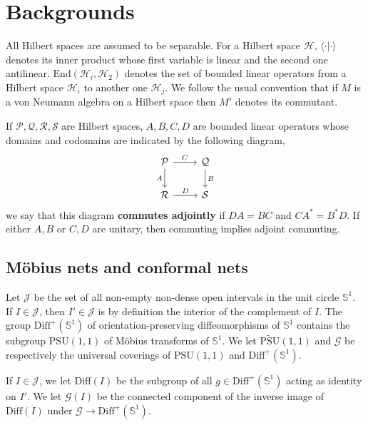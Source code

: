 \documentclass[12pt,a4paper,notitlepage]{article}
\theoremstyle{definition}
\theoremstyle{plain}
\newcommand{\mc}{\mathcal}
\newcommand{\End}{\mathrm{End}} %
\newcommand{\Diffp}{\mathrm{Diff}^+}
\newcommand{\Diff}{\mathrm{Diff}}
\newcommand{\PSU}{\mathrm{PSU}(1,1)}
\newcommand{\bk}[1]{\langle {#1}\rangle}
\newcommand{\scr}{\mathscr}
\newcommand{\mbb}{\mathbb}
\newcommand{\UPSU}{\widetilde{\mathrm{PSU}}(1,1)}
\newcommand{\Sbb}{{\mathbb S}}
\numberwithin{equation}{section}
\begin{document}
	
	
	



	
\section{Backgrounds}\label{lb18}


All Hilbert spaces are assumed to be separable.	For a Hilbert space $\mc H$, $\bk{\cdot|\cdot}$ denotes its inner product whose first variable is linear and the second one antilinear. $\End(\mc H_i,\mc H_2)$ denotes the set of bounded linear operators from a Hilbert space $\mc H_i$ to another one $\mc H_j$. We follow the usual convention that if $M$ is a von Neumann algebra on a Hilbert space then $M'$ denotes its commutant.

If $\mc P,\mc Q,\mc R,\mc S$ are Hilbert spaces, $A,B,C,D$ are bounded linear operators whose domains and codomains are indicated by the following diagram,
\begin{equation}
	\begin{tikzcd}
		\mc P \arrow[r, "C"] \arrow[d, "A"'] & \mc Q \arrow[d, "B"]\\
		\mc R\arrow[r, "D"] &\mc S
	\end{tikzcd}
\end{equation}
we say that this diagram \textbf{commutes adjointly} if $DA=BC$ and $CA^*=B^*D$. If either $A,B$ or $C,D$ are unitary, then commuting implies adjoint commuting.

\subsection*{M\"obius nets and conformal nets}


	
Let $\mc J$ be the set of all non-empty non-dense open intervals in the unit circle $\mbb S^1$. If $I\in\mc J$, then $I'\in\mc J$ is by definition the interior of the complement of $I$. The group $\Diffp(\mbb S^1)$ of orientation-preserving diffeomorphisms of $\mbb S^1$ contains the subgroup $\PSU$ of M\"obius transforms of $\mbb S^1$. We let $\UPSU$ and $\scr G$ be respectively the universal coverings of $\PSU$ and $\Diffp(\mbb S^1)$. 

If $I\in\mc J$, we let $\Diff(I)$ be the subgroup of all $g\in\Diffp(\mbb S^1)$ acting as identity on $I'$. We let $\scr G(I)$ be the connected component of the inverse image of $\Diff(I)$ under $\scr G\rightarrow\Diffp(\Sbb^1)$.
\end{document}

